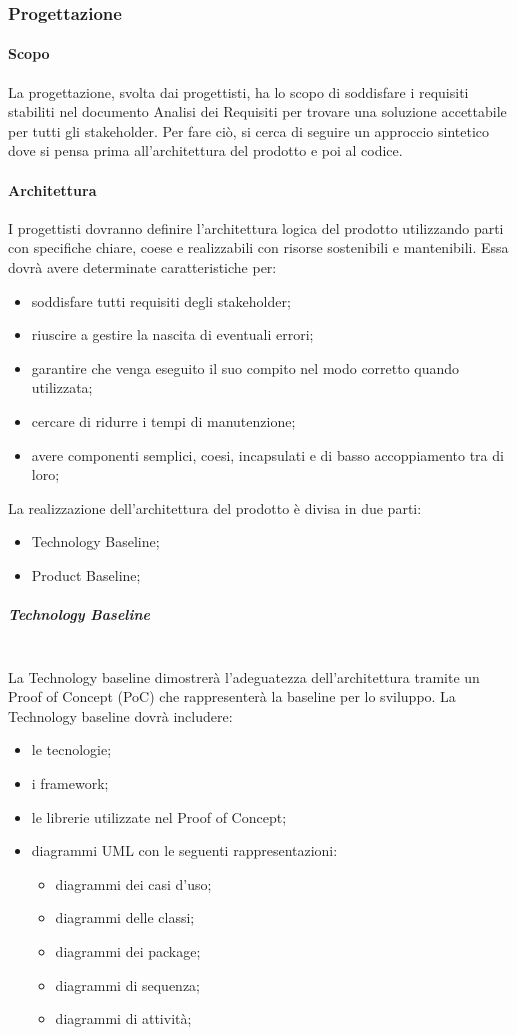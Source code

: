
	\subsubsection{Progettazione}
	\paragraph{Scopo}
	La progettazione, svolta dai progettisti, ha lo scopo di soddisfare i requisiti stabiliti nel documento Analisi dei Requisiti per trovare una soluzione accettabile per tutti gli stakeholder.
	Per fare ciò, si cerca di seguire un approccio sintetico dove si pensa prima all’architettura del prodotto e poi al codice.
	\paragraph{Architettura}	I progettisti dovranno definire l’architettura logica del prodotto utilizzando parti con specifiche chiare, coese e realizzabili con risorse sostenibili e mantenibili. Essa dovrà avere determinate caratteristiche per:
	\begin{itemize}
		\item	soddisfare tutti requisiti degli stakeholder;
		\item	riuscire a gestire la nascita di eventuali errori;
		\item	garantire che venga eseguito il suo compito nel modo corretto quando utilizzata;
		\item	cercare di ridurre i tempi di manutenzione;
		\item   avere componenti semplici, coesi, incapsulati e di basso accoppiamento tra di loro;
	\end{itemize}
	La realizzazione dell’architettura del prodotto è divisa in due parti:
	\begin{itemize}
		\item Technology Baseline;
		\item Product Baseline;
	\end{itemize}
	\subparagraph{Technology Baseline}\mbox{}\\
	La Technology baseline dimostrerà l’adeguatezza dell’architettura tramite un Proof of Concept (PoC) che rappresenterà la baseline per lo sviluppo. 
	La Technology baseline dovrà includere:
	\begin{itemize}
		\item le tecnologie;
		\item i framework;
		\item le librerie utilizzate nel Proof of Concept;
		\item diagrammi UML con le seguenti rappresentazioni:
		\begin{itemize}
			\item 	diagrammi dei casi d’uso; 
			\item 	diagrammi delle classi; 
			\item 	diagrammi dei package;
			\item 	diagrammi di sequenza; 
			\item 	diagrammi di attività;
		\end{itemize}
	\end{itemize}
